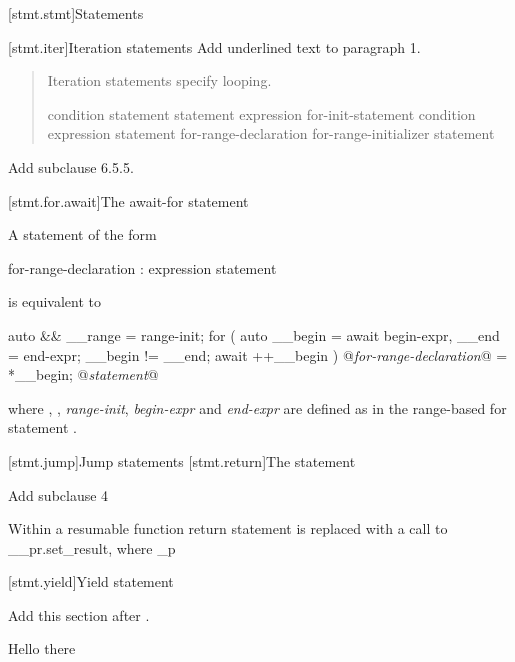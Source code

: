 
[stmt.stmt]{Statements}%

\setcounter{section}{4}
[stmt.iter]{Iteration statements}%
Add underlined text to paragraph 1.

\begin{quote}
\pnum
Iteration statements specify looping.

%
%
%
%
\begin{bnf}
	\br
	 condition \terminal{)} statement\br
	 statement  expression \terminal{) ;}\br
	 for-init-statement condition\opt \terminal{;} expression\opt \terminal{)} statement\br
	 for-range-declaration \terminal{:} for-range-initializer \terminal{)} statement\br
\end{bnf}
\end{quote}

Add subclause 6.5.5.

\setcounter{subsection}{4}
[stmt.for.await]{The await-for statement}%

\pnum
A  statement of the form

\begin{ncbnf}
	 for-range-declaration : expression \terminal{)} statement
\end{ncbnf}

is equivalent to

\begin{codeblock}
	{
		auto && __range = range-init;
		for ( auto __begin = await begin-expr,
		__end = end-expr;
		__begin != __end;
		await ++__begin ) {
			@\textit{for-range-declaration}@ = *__begin;
			@\textit{statement}@
		}
	}
\end{codeblock}

where , , 
\textit{range-init}, \textit{begin-expr} and \textit{end-expr} are defined as in the range-based for statement .

\setcounter{section}{5}
[stmt.jump]{Jump statements}%
\setcounter{subsection}{2}
[stmt.return]{The  statement}%


Add subclause 4

\setcounter{Paras}{3}
\pnum 
Within a resumable function return statement is replaced with
a call to __pr.set_result, where _p

\setcounter{section}{8}
[stmt.yield]{Yield statement}%

Add this section after .

Hello there


